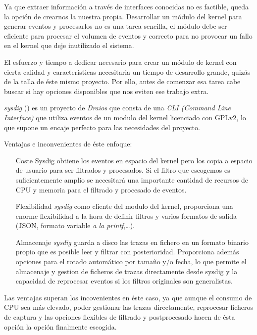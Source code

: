 Ya que extraer información a través de interfaces conocidas no es factible, queda la opción de crearnos la nuestra propia. 
Desarrollar un módulo del kernel para generar eventos y procesarlos no es una tarea sencilla, el módulo debe ser eficiente para procesar el volumen
de eventos y correcto para no provocar un fallo en el kernel que deje inutilizado el sistema.

El esfuerzo y tiempo a dedicar necesario para crear un módulo de kernel con cierta calidad y caracteristicas necesitaria un tiempo de desarrollo grande, quizás de la talla
de éste mismo proyecto. Por ello, antes de comenzar esa tarea cabe buscar si hay opciones disponibles que nos eviten ese trabajo extra.

\emph{sysdig} (\cite{sysdig-project}) es un proyecto de \emph{Draios} que consta de una \emph{CLI (Command Line Interface)} que utiliza eventos de un modulo del kernel
licenciado con GPLv2, lo que supone un encaje perfecto para las necesidades del proyecto.

Ventajas e inconvenientes de éste enfoque:

\begin{enumerate}
    \item[Coste] Sysdig obtiene los eventos en espacio del kernel pero los copia a espacio de usuario para ser
    filtrados y procesados. Si el filtro que escogemos es suficientemente amplio se necesitará una importante cantidad de recursos de CPU y memoria para el filtrado y procesado de eventos.
    \item[Flexibilidad] \emph{sysdig} como cliente del modulo del kernel, proporciona una enorme flexibilidad a la hora de definir filtros y varios formatos de salida (JSON, formato variable \emph{a la printf},\ldots).
    \item[Almacenaje] \emph{sysdig} guarda a disco las trazas en fichero en un formato binario propio que es posible leer y filtrar con posterioridad. Proporciona además opciones para el rotado automático por tamaño y/o fecha,
    lo que permite el almacenaje y gestion de ficheros de trazas directamente desde sysdig y la capacidad de reprocesar eventos si los filtros originales son generalistas. 
\end{enumerate}

Las ventajas superan los incovenientes en éste caso, ya que aunque el consumo de CPU sea más elevado, poder gestionar las trazas directamente, reprocesar ficheros de captura y las opciones flexibles de filtrado y postprocesado hacen de ésta opción la opción finalmente escogida.

